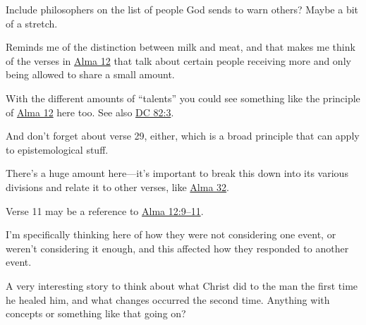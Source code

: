 \begin{compactdesc}
					\begin{compactitem}
						\item Include philosophers on the list of people God sends to warn others? Maybe a bit of a stretch.
					\end{compactitem}
				\item[{\hyperref[MATTHEW-24-45]{Matthew 24:45}}] \phantom{.}
					\begin{compactitem}
						\item Reminds me of the distinction between milk and meat, and that makes me think of the verses in \hyperref[ALMA-12]{Alma 12} that talk about certain people receiving more and only being allowed to share a small amount.
					\end{compactitem}
				\item[{\hyperref[MATTHEW-25-14]{Matthew 25:14--30}}] \phantom{.}
					\begin{compactitem}
						\item With the different amounts of ``talents'' you could see something like the principle of \hyperref[ALMA-12]{Alma 12} here too. See also \hyperref[DC82-3]{DC 82:3}.
						\item And don't forget about verse 29, either, which is a broad principle that can apply to epistemological stuff.
					\end{compactitem}
				\item[{\hyperref[MARK-4-3]{Mark 4:3--34}}] \phantom{.}
					\begin{compactitem}
						\item There's a huge amount here---it's important to break this down into its various divisions and relate it to other verses, like \hyperref[ALMA-32]{Alma 32}.
						\item Verse 11 may be a reference to \hyperref[ALMA-12-9]{Alma 12:9--11}.
					\end{compactitem}
				\item[{\hyperref[MARK-6-51]{Mark 6:51--52}}] \phantom{.}
					\begin{compactitem}
						\item I'm specifically thinking here of how they were not considering one event, or weren't considering it enough, and this affected how they responded to another event.
					\end{compactitem}
				\item[{\hyperref[MARK-8-22]{Mark 8:22--26}}] \phantom{.}
					\begin{compactitem}
						\item A very interesting story to think about what Christ did to the man the first time he healed him, and what changes occurred the second time. Anything with concepts or something like that going on?

\end{compactitem}
\end{compactdesc}
